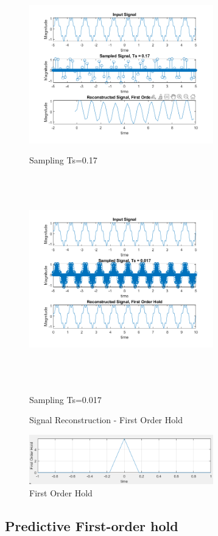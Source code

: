 \documentclass{article}
\begin{document}
\begin{figure}[!htb]
      \includegraphics[width=8cm]{figures/First_Order_Hold_0.17.png}
      \caption{Sampling Ts=0.17}
    \endminipage\hfill
      \includegraphics[width=8cm, height=9cm]{figures/First_Order_Hold_0.017.png}
      \caption{Sampling Ts=0.017}
    \endminipage\hfill
    \caption{Signal Reconstruction - First Order Hold}
\end{figure}
    

\begin{figure}[htbp]
    \begin{center}
	\includegraphics[width=80mm]{figures/FOH_.PNG}
    \end{center}
    \caption{First Order Hold}
\end{figure}    

    
\subsection{Predictive First-order hold}
\end{document}
